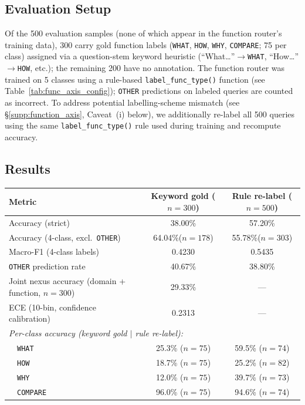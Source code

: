 \documentclass[a4paper,fleql,doubleblind]{cas-sc}
\begin{document}
\subsection*{Evaluation Setup}

Of the 500 evaluation samples (none of which appear in the function router's
training data), 300 carry gold function labels
(\texttt{WHAT}, \texttt{HOW}, \texttt{WHY}, \texttt{COMPARE}; 75 per class)
assigned via a question-stem keyword heuristic
(``What\ldots''$\to$\texttt{WHAT}, ``How\ldots''$\to$\texttt{HOW}, etc.);
the remaining 200 have no annotation.
The function router was trained on 5 classes using a rule-based
\texttt{label\_func\_type()} function (see Table~\ref{tab:func_axis_config});
\texttt{OTHER} predictions on labeled queries are counted as incorrect.
To address potential labelling-scheme mismatch (see \S\ref{supp:function_axis},
Caveat~(i) below), we additionally re-label all 500 queries using the same
\texttt{label\_func\_type()} rule used during training and recompute accuracy.

\subsection*{Results}

\vspace{4pt}
\begin{center}
\begingroup
{}
\label{tab:func_axis}
\renewcommand{\arraystretch}{1.25}
\begin{tabular}{lcc}
\toprule
\textbf{Metric} & \textbf{Keyword gold ($n{=}300$)} & \textbf{Rule re-label ($n{=}500$)} \\
\midrule
Accuracy (strict)                    & 38.00\% & 57.20\% \\
Accuracy (4-class, excl.\ \texttt{OTHER}) & 64.04\%\;($n{=}178$) & 55.78\%\;($n{=}303$) \\
Macro-F1 (4-class labels)            & 0.4230  & 0.5435  \\
\texttt{OTHER} prediction rate       & 40.67\% & 38.80\% \\
Joint nexus accuracy (domain + function, $n{=}300$) & 29.33\% & --- \\
ECE (10-bin, confidence calibration) & 0.2313  & ---     \\
\midrule
\multicolumn{3}{l}{\textit{Per-class accuracy (keyword gold $\mid$ rule re-label):}} \\
~~\texttt{WHAT}   & 25.3\% ($n{=}75$) & 59.5\% ($n{=}74$) \\
~~\texttt{HOW}    & 18.7\% ($n{=}75$) & 25.2\% ($n{=}82$) \\
~~\texttt{WHY}    & 12.0\% ($n{=}75$) & 39.7\% ($n{=}73$) \\
~~\texttt{COMPARE}& 96.0\% ($n{=}75$) & 94.6\% ($n{=}74$) \\
\bottomrule
\end{tabular}
\endgroup
\end{center}
\vspace{6pt}
\end{document}

